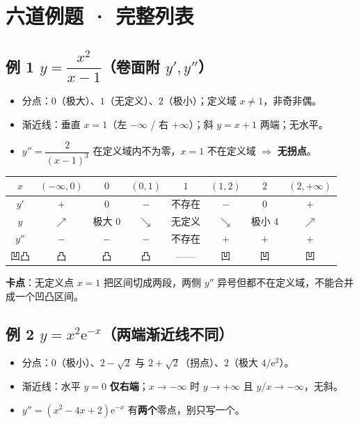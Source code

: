 \documentclass[11pt,a4paper]{ctexart}
\newcommand{\ee}{\mathrm{e}}
\begin{document}
\section{六道例题 · 完整列表}

\subsection{例 1 $y=\dfrac{x^2}{x-1}$（卷面附 $y',y''$）}

\begin{itemize}[label=$\bullet$,leftmargin=1.5em]
\item 分点：$0$（极大）、$1$（无定义）、$2$（极小）；定义域 $x\ne1$，非奇非偶。
\item 渐近线：垂直 $x=1$（左 $-\infty$ / 右 $+\infty$）；斜 $y=x+1$ 两端；无水平。
\item $y''=\dfrac{2}{(x-1)^3}$ 在定义域内不为零，$x=1$ 不在定义域 $\Rightarrow$ \textbf{无拐点}。
\end{itemize}

\begin{center}
\footnotesize\setlength{\tabcolsep}{1.5pt}
\begin{tabular}{@{}c|ccccccc@{}}
$x$ & $(-\infty,0)$ & $0$ & $(0,1)$ & $1$ & $(1,2)$ & $2$ & $(2,+\infty)$ \\
\hline
$y'$ & $+$ & $0$ & $-$ & 不存在 & $-$ & $0$ & $+$ \\
$y$ & $\nearrow$ & 极大 $0$ & $\searrow$ & 无定义 & $\searrow$ & 极小 $4$ & $\nearrow$ \\
$y''$ & $-$ & $-$ & $-$ & 不存在 & $+$ & $+$ & $+$ \\
凹凸 & 凸 & 凸 & 凸 & —— & 凹 & 凹 & 凹 \\
\end{tabular}
\end{center}

\noindent\textbf{卡点}：无定义点 $x=1$ 把区间切成两段，两侧 $y''$ 异号但都不在定义域，不能合并成一个凹凸区间。

\subsection{例 2 $y=x^2\ee^{-x}$（两端渐近线不同）}

\begin{itemize}[label=$\bullet$,leftmargin=1.5em]
\item 分点：$0$（极小）、$2-\sqrt2$ 与 $2+\sqrt2$（拐点）、$2$（极大 $4/\ee^2$）。
\item 渐近线：水平 $y=0$ \textbf{仅右端}；$x\to-\infty$ 时 $y\to+\infty$ 且 $y/x\to-\infty$，无斜。
\item $y''=(x^2-4x+2)\ee^{-x}$ 有\textbf{两个}零点，别只写一个。
\end{itemize}
\end{document}
